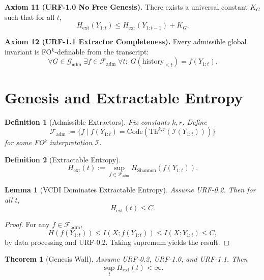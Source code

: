 \documentclass[11pt]{article}
\newtheorem{theorem}{Theorem}
\newtheorem{lemma}{Lemma}
\newtheorem{definition}{Definition}
\begin{document}
\textbf{Axiom 11 (URF-1.0 No Free Genesis).}  
There exists a universal constant $K_G$ such that for all $t$,
\[
H_{\mathrm{ext}}(Y_{1:t}) \le H_{\mathrm{ext}}(Y_{1:t-1}) + K_G.
\]

\textbf{Axiom 12 (URF-1.1 Extractor Completeness).}  
Every admissible global invariant is FO$^k$-definable from the transcript:
\[
\forall G\in\mathcal G_{\mathrm{adm}}\;\exists f\in\mathcal F_{\mathrm{adm}}\;\forall t:\;
G(\mathrm{history}_{\le t}) = f(Y_{1:t}).
\]

\section*{Genesis and Extractable Entropy}

\begin{definition}[Admissible Extractors]
Fix constants $k,r$. Define
\[
\mathcal F_{\mathrm{adm}} := 
\{ f \mid f(Y_{1:t}) = \mathrm{Code}(\mathrm{Th}^{k,r}(\mathcal I(Y_{1:t}))) \}
\]
for some FO$^k$ interpretation $\mathcal I$.
\end{definition}

\begin{definition}[Extractable Entropy]
\[
H_{\mathrm{ext}}(t) := \sup_{f\in\mathcal F_{\mathrm{adm}}}
H_{\mathrm{Shannon}}(f(Y_{1:t})).
\]
\end{definition}

\begin{lemma}[VCDI Dominates Extractable Entropy]
Assume URF-0.2. Then for all $t$,
\[
H_{\mathrm{ext}}(t) \le C.
\]
\end{lemma}

\begin{proof}
For any $f\in\mathcal F_{\mathrm{adm}}$,
\[
H(f(Y_{1:t})) \le I(X;f(Y_{1:t}))
\le I(X;Y_{1:t}) \le C,
\]
by data processing and URF-0.2. Taking supremum yields the result.
\end{proof}

\begin{theorem}[Genesis Wall]
Assume URF-0.2, URF-1.0, and URF-1.1. Then
\[
\sup_t H_{\mathrm{ext}}(t) < \infty.
\]
\end{theorem}
\end{document}
